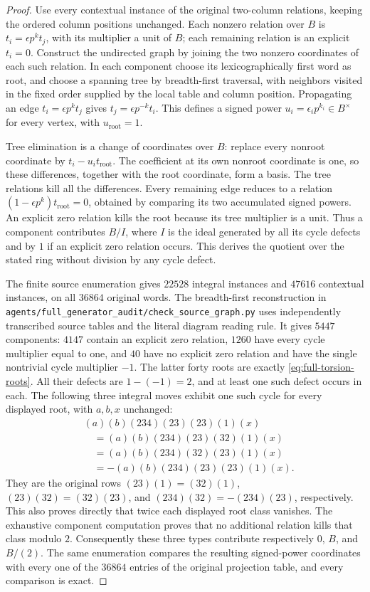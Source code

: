 \begin{proof}
Use every contextual instance of the original two-column
relations, keeping the ordered column positions unchanged.
Each nonzero relation over $B$ is
$t_i=\epsilon p^k t_j$, with its multiplier a unit of $B$;
each remaining relation is an explicit $t_i=0$. Construct
the undirected graph by joining the two nonzero coordinates
of each such relation. In each component choose its
lexicographically first word as root, and choose a spanning
tree by breadth-first traversal, with neighbors visited in
the fixed order supplied by the local table and column
position. Propagating an edge
$t_i=\epsilon p^k t_j$ gives
$t_j=\epsilon p^{-k}t_i$. This defines a signed power
$u_i=\epsilon_i p^{k_i}\in B^\times$ for every vertex,
with $u_{\mathrm{root}}=1$.

Tree elimination is a change of coordinates over $B$:
replace every nonroot coordinate by
$t_i-u_i t_{\mathrm{root}}$. The coefficient at its own
nonroot coordinate is one, so these differences, together
with the root coordinate, form a basis. The tree relations
kill all the differences. Every remaining edge reduces
to a relation
$(1-\epsilon p^k)t_{\mathrm{root}}=0$, obtained by
comparing its two accumulated signed powers. An explicit
zero relation kills the root because its tree multiplier
is a unit. Thus a component contributes $B/I$, where
$I$ is the ideal generated by all its cycle defects and
by $1$ if an explicit zero relation occurs. This derives
the quotient over the stated ring without division by
any cycle defect.

The finite source enumeration gives $22528$ integral
instances and $47616$ contextual instances, on all $36864$
original words. The breadth-first reconstruction in
\texttt{agents/full\_generator\_audit/check\_source\_graph.py}
uses independently transcribed source tables and the
literal diagram reading rule. It gives $5447$ components:
$4147$ contain an explicit zero relation, $1260$ have
every cycle multiplier equal to one, and $40$ have no
explicit zero relation and have the single nontrivial
cycle multiplier $-1$. The latter forty roots are exactly
\eqref{eq:full-torsion-roots}. All their defects are
$1-(-1)=2$, and at least one such defect occurs in each.
The following three integral moves exhibit one such
cycle for every displayed root, with $a,b,x$ unchanged:
\[
\begin{split}
 &(a)(b)(234)(23)(23)(1)(x)\\
 &\quad=(a)(b)(234)(23)(32)(1)(x)\\
 &\quad=(a)(b)(234)(32)(23)(1)(x)\\
 &\quad=-(a)(b)(234)(23)(23)(1)(x).
\end{split}
\]
They are the original rows $(23)(1)=(32)(1)$,
$(23)(32)=(32)(23)$, and
$(234)(32)=-(234)(23)$, respectively. This also
proves directly that twice each displayed root class
vanishes. The exhaustive component computation proves
that no additional relation kills that class modulo $2$.
Consequently these three types contribute respectively
$0$, $B$, and $B/(2)$. The same enumeration compares the
resulting signed-power coordinates with every one of the
$36864$ entries of the original projection table, and
every comparison is exact.


\end{proof}

